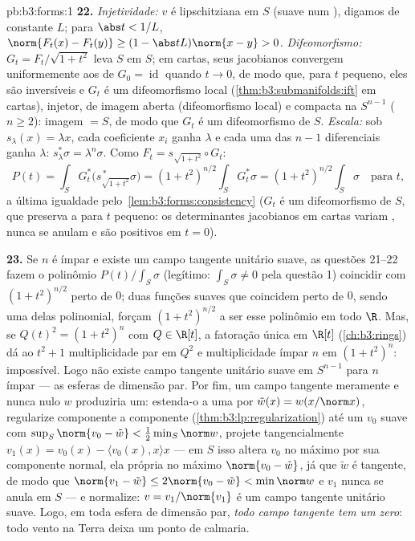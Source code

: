 \begin{solution}{pb:b3:forms:1}
\textbf{22.} \emph{Injetividade:} $v$ é lipschitziana em $S$
(suave num ), digamos de constante $L$; para $\abs t <
1/L$, $\norm{F_t(x) - F_t(y)} \geq (1 - \abs
tL)\norm{x - y} > 0$. \emph{Difeomorfismo:} $G_t =
F_t/\sqrt{1 + t^2}$ leva $S$ em $S$; em cartas, seus jacobianos
convergem uniformemente aos de $G_0 = \operatorname{id}$ quando
$t \to 0$, de modo que, para $t$ pequeno, eles são inversíveis e $G_t$ é
um difeomorfismo local (\cref{thm:b3:submanifolds:ift} em
cartas), injetor, de imagem aberta (difeomorfismo local) e
compacta na \emph{} $S^{n-1}$ ($n \geq 2$):
imagem $= S$, de modo que $G_t$ é um difeomorfismo de $S$.
\emph{Escala:} sob $s_\lambda(x) = \lambda x$, cada
coeficiente $x_i$ ganha $\lambda$ e cada uma das $n - 1$
diferenciais ganha $\lambda$: $s_\lambda^*\sigma =
\lambda^n\sigma$. Como $F_t = s_{\sqrt{1+t^2}}\circ G_t$:
\[
P(t) = \int_SG_t^*\bigl(s_{\sqrt{1+t^2}}^{\,*}\sigma\bigr)
= (1 + t^2)^{n/2}\int_SG_t^*\sigma
= (1 + t^2)^{n/2}\int_S\sigma
\quad\text{para } t,
\]
a última igualdade pelo~\cref{lem:b3:forms:consistency} ($G_t$
é um difeomorfismo de $S$, que preserva a  para $t$
pequeno: os determinantes jacobianos em cartas variam ,
nunca se anulam e são positivos em $t = 0$).

\textbf{23.} Se $n$ é ímpar e existe um campo tangente unitário
suave, as questões 21--22 fazem o polinômio
$P(t)/\int_S\sigma$ (legítimo: $\int_S\sigma \neq 0$ pela
questão 1) coincidir com $(1 + t^2)^{n/2}$ perto de $0$; duas
funções suaves que coincidem perto de $0$, sendo uma delas polinomial,
forçam $(1 + t^2)^{n/2}$ a ser esse polinômio em todo
$\R$. Mas, se $Q(t)^2 = (1 + t^2)^n$ com $Q \in \R[t]$,
a fatoração única em $\R[t]$
(\cref{ch:b3:rings}) dá ao  $t^2 + 1$ multiplicidade
par em $Q^2$ e multiplicidade ímpar $n$ em
$(1 + t^2)^n$: impossível. Logo não existe campo tangente unitário
suave em $S^{n-1}$ para $n$ ímpar --- as esferas de
dimensão par. Por fim, um campo tangente meramente  e
nunca nulo $w$ produziria um: estenda-o a uma
 por $\tilde w(x) = w(x/\norm x)$, regularize
componente a componente (\cref{thm:b3:lp:regularization}) até um
$v_0$ suave com $\sup_S\norm{v_0 - \tilde w} <
\frac12\min_S\norm w$, projete tangencialmente $v_1(x) = v_0(x)
- \langle v_0(x), x\rangle x$ --- em $S$ isso altera $v_0$
no máximo por sua componente normal, ela própria no máximo $\norm{v_0 -
\tilde w}$, já que $\tilde w$ é tangente, de modo que $\norm{v_1 - \tilde
w} \leq 2\norm{v_0 - \tilde w} < \min\norm w$ e $v_1$
nunca se anula em $S$ --- e normalize: $v =
v_1/\norm{v_1}$ é um campo tangente unitário suave. Logo, em
toda esfera de dimensão par, \emph{todo campo tangente 
tem um zero}: todo vento na Terra deixa um ponto de
calmaria.


\end{solution}
